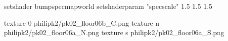setshader bumpspecmapworld
setshaderparam "specscale" 1.5 1.5 1.5

texture 0 philipk2/pk02_floor06b_C.png
texture n philipk2/pk02_floor06a_N.png
texture s philipk2/pk02_floor06a_S.png

